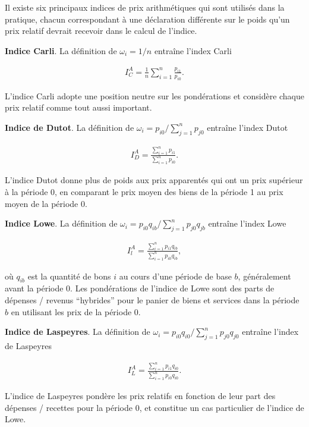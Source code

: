 \documentclass[
]{article}
\begin{document}
Il existe six principaux indices de prix arithmétiques qui sont utilisés dans la pratique, chacun correspondant à une déclaration différente sur le poids qu'un prix relatif devrait recevoir dans le calcul de l'indice.

\textbf{Indice Carli}. La définition de \(\omega_{i} = 1 / n\) entraîne l'index Carli

\begin{align*}
I^{A}_{C} = \frac{1}{n} \sum_{i = 1}^{n} \frac{p_{i1}}{p_{i0}}.
\end{align*}

L'indice Carli adopte une position neutre sur les pondérations et considère chaque prix relatif comme tout aussi important.

\textbf{Indice de Dutot}. La définition de \(\omega_{i} = p_{i0} / \sum_{j = 1}^{n} p_{j0}\) entraîne l'index Dutot

\begin{align*}
I^{A}_D = \frac{\sum_{i = 1}^{n} p_{i1}}{\sum_{i = 1}^{n} p_{i0}}.
\end{align*}

L'indice Dutot donne plus de poids aux prix apparentés qui ont un prix supérieur à la période 0, en comparant le prix moyen des biens de la période 1 au prix moyen de la période 0.

\textbf{Indice Lowe}. La définition de \(\omega_{i} = p_{i0} q_{ib} / \sum_{j = 1}^{n} p_{j0} q_{jb}\) entraîne l'index Lowe

\begin{align*}
I^{A}_{l} = \frac{\sum_{i = 1}^{n} p_{i1} q_{ib}}{\sum_{i = 1}^{n} p_{i0} q_{ib}},
\end{align*}

où \(q_{ib}\) est la quantité de bons \(i\) au cours d'une période de base \(b\), généralement avant la période 0. Les pondérations de l'indice de Lowe sont des parts de dépenses / revenus ``hybrides'' pour le panier de biens et services dans la période \(b\) en utilisant les prix de la période 0.

\textbf{Indice de Laspeyres}. La définition de \(\omega_{i} = p_{i0} q_{i0} / \sum_{j = 1}^{n} p_{j0} q_{j0}\) entraîne l'index de Laspeyres

\begin{align*}
I^{A}_{L} = \frac{\sum_{i = 1}^{n} p_{i1} q_{i0}}{\sum_{i = 1}^{n} p_{i0} q_{i0}}.
\end{align*}

L'indice de Laspeyres pondère les prix relatifs en fonction de leur part des dépenses / recettes pour la période 0, et constitue un cas particulier de l'indice de Lowe.
\end{document}
